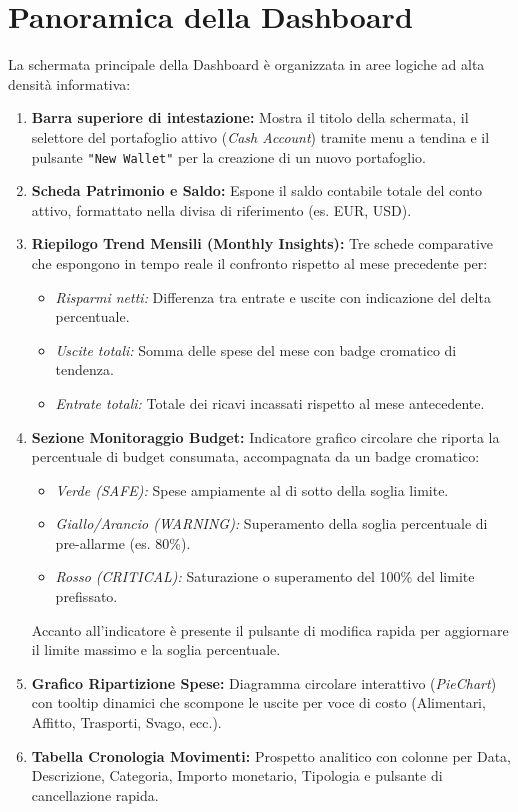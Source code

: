 \documentclass[11pt,a4paper,openright]{report}
\begin{document}
\section*{Panoramica della Dashboard}
La schermata principale della Dashboard è organizzata in aree logiche ad alta densità informativa:
\begin{enumerate}
  \item \textbf{Barra superiore di intestazione:} Mostra il titolo della schermata, il selettore del portafoglio attivo (\emph{Cash Account}) tramite menu a tendina e il pulsante \texttt{"New Wallet"} per la creazione di un nuovo portafoglio.
  \item \textbf{Scheda Patrimonio e Saldo:} Espone il saldo contabile totale del conto attivo, formattato nella divisa di riferimento (es. EUR, USD).
  \item \textbf{Riepilogo Trend Mensili (Monthly Insights):} Tre schede comparative che espongono in tempo reale il confronto rispetto al mese precedente per:
  \begin{itemize}
    \item \emph{Risparmi netti:} Differenza tra entrate e uscite con indicazione del delta percentuale.
    \item \emph{Uscite totali:} Somma delle spese del mese con badge cromatico di tendenza.
    \item \emph{Entrate totali:} Totale dei ricavi incassati rispetto al mese antecedente.
  \end{itemize}
  \item \textbf{Sezione Monitoraggio Budget:} Indicatore grafico circolare che riporta la percentuale di budget consumata, accompagnata da un badge cromatico:
  \begin{itemize}
    \item \emph{Verde (SAFE):} Spese ampiamente al di sotto della soglia limite.
    \item \emph{Giallo/Arancio (WARNING):} Superamento della soglia percentuale di pre-allarme (es. 80\%).
    \item \emph{Rosso (CRITICAL):} Saturazione o superamento del 100\% del limite prefissato.
  \end{itemize}
  Accanto all'indicatore è presente il pulsante di modifica rapida per aggiornare il limite massimo e la soglia percentuale.
  \item \textbf{Grafico Ripartizione Spese:} Diagramma circolare interattivo (\emph{PieChart}) con tooltip dinamici che scompone le uscite per voce di costo (Alimentari, Affitto, Trasporti, Svago, ecc.).
  \item \textbf{Tabella Cronologia Movimenti:} Prospetto analitico con colonne per Data, Descrizione, Categoria, Importo monetario, Tipologia e pulsante di cancellazione rapida.
\end{enumerate}
\end{document}
